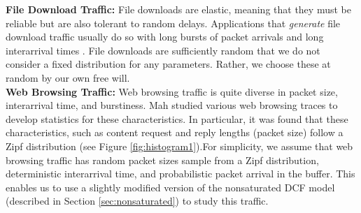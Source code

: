 \documentclass{llncs}
\begin{document}
\noindent
\textbf{File Download Traffic:} File downloads are elastic, meaning that they must be reliable but are also tolerant to random delays. Applications that \emph{generate} file download traffic usually do so with long bursts of packet arrivals and long interarrival times \cite{kumar2004communication}. File downloads are sufficiently random that we do not consider a fixed distribution for any parameters. Rather, we choose these at random by our own free will. \\

\noindent
\textbf{Web Browsing Traffic:} Web browsing traffic is quite diverse in packet size, interarrival time, and burstiness. Mah \cite{mah1997empirical} studied various web browsing traces to develop statistics for these characteristics. In particular, it was found that these characteristics, such as content request and reply lengths (packet size) follow a Zipf distribution (see Figure \ref{fig:histogram1}).For simplicity, we assume that web browsing traffic has random packet sizes sample from a Zipf distribution, deterministic interarrival time, and probabilistic packet arrival in the buffer. This enables us to use a slightly modified version of the nonsaturated DCF model (described in Section \ref{sec:nonsaturated}) to study this traffic. \\
\end{document}
